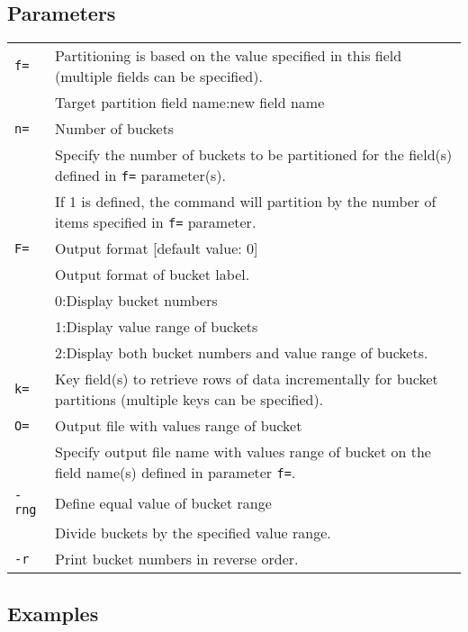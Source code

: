 \subsection*{Parameters}
\begin{table}[htbp]
{\small
\begin{tabular}{ll}
\verb|f=|    & Partitioning is based on the value specified in this field (multiple fields can be specified). \\
             & Target partition field name:new field name \\
 \verb|n=|    & Number of buckets \\
             & Specify the number of buckets to be partitioned for the field(s) defined in \verb|f=| parameter(s). \\
             & If 1 is defined, the command will partition by the number of items specified in \verb|f=| parameter.\\

\verb|F=|    & Output format [default value: 0]\\
             & Output format of bucket label. \\
             & 0:Display bucket numbers\\
             & 1:Display value range of buckets\\
             & 2:Display both bucket numbers and value range of buckets. \\
\verb|k=|    & Key field(s) to retrieve rows of data incrementally for bucket partitions (multiple keys can be specified). \\
\verb|O=|    & Output file with values range of bucket \\
             & Specify output file name with values range of bucket on the field name(s) defined in parameter \verb|f=|. \\
\verb|-rng|  & Define equal value of bucket range \\
             & Divide buckets by the specified value range. \\
\verb|-r|    & Print bucket numbers in reverse order.  \\

\end{tabular} 
}
\end{table} 

\subsection*{Examples}


